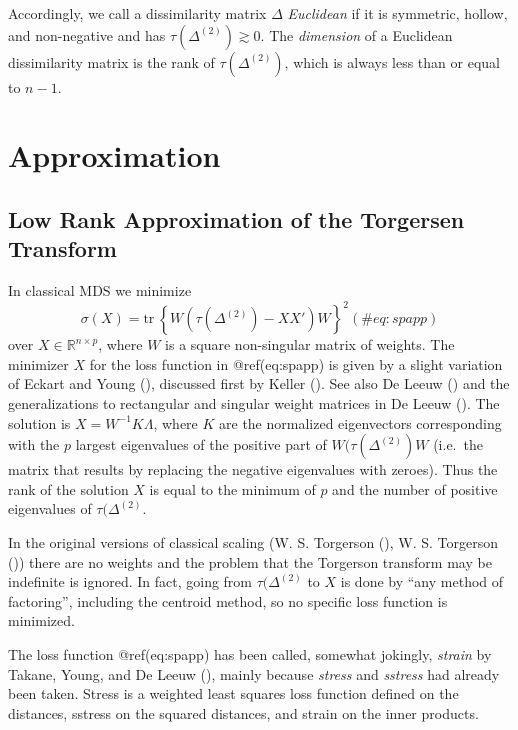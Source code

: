 \documentclass[
  12pt,
  letterpaper,
  DIV=11,
  numbers=noendperiod]{scrreprt}
\theoremstyle{remark}
\begin{document}
Accordingly, we call a dissimilarity matrix \(\Delta\) \emph{Euclidean}
if it is symmetric, hollow, and non-negative and has
\(\tau(\Delta^{(2)})\gtrsim 0\). The \emph{dimension} of a Euclidean
dissimilarity matrix is the rank of \(\tau(\Delta^{(2)})\), which is
always less than or equal to \(n-1\).

\section{Approximation}\label{approximation}

\subsection{Low Rank Approximation of the Torgersen
Transform}\label{low-rank-approximation-of-the-torgersen-transform}

In classical MDS we minimize \begin{equation}
\sigma(X)=\text{tr}\ \left\{W(\tau(\Delta^{(2)})-XX')W\right\}^2
(\#eq:spapp)
\end{equation} over \(X\in\mathbb{R}^{n\times p}\), where \(W\) is a
square non-singular matrix of weights. The minimizer \(X\) for the loss
function in @ref(eq:spapp) is given by a slight variation of Eckart and
Young (), discussed first by Keller
(). See also De Leeuw
() and the generalizations to
rectangular and singular weight matrices in De Leeuw
(). The solution is
\(X=W^{-1}K\Lambda\), where \(K\) are the normalized eigenvectors
corresponding with the \(p\) largest eigenvalues of the positive part of
\(W(\tau(\Delta^{(2)})W\) (i.e.~the matrix that results by replacing the
negative eigenvalues with zeroes). Thus the rank of the solution \(X\)
is equal to the minimum of \(p\) and the number of positive eigenvalues
of \(\tau(\Delta^{(2)}\).

In the original versions of classical scaling (W. S. Torgerson
(), W. S. Torgerson
()) there are no weights and the
problem that the Torgerson transform may be indefinite is ignored. In
fact, going from \(\tau(\Delta^{(2)}\) to \(X\) is done by ``any method
of factoring'', including the centroid method, so no specific loss
function is minimized.

The loss function @ref(eq:spapp) has been called, somewhat jokingly,
\emph{strain} by Takane, Young, and De Leeuw
(), mainly because
\emph{stress} and \emph{sstress} had already been taken. Stress is a
weighted least squares loss function defined on the distances, sstress
on the squared distances, and strain on the inner products.
\end{document}
